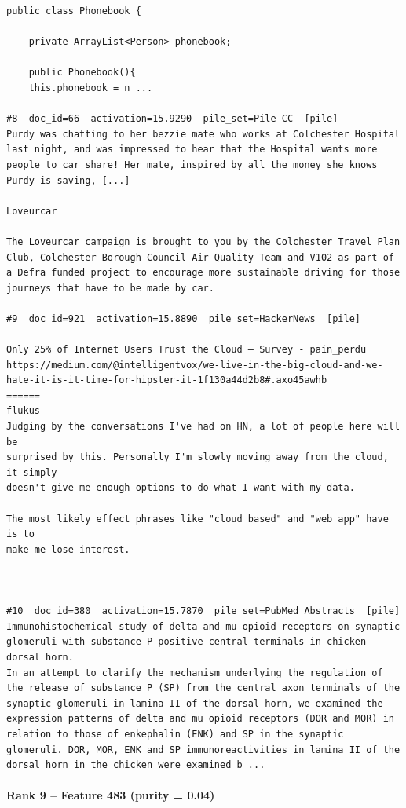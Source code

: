 \begin{verbatim}
public class Phonebook {

    private ArrayList<Person> phonebook;

    public Phonebook(){
    this.phonebook = n ...

#8  doc_id=66  activation=15.9290  pile_set=Pile-CC  [pile]
Purdy was chatting to her bezzie mate who works at Colchester Hospital last night, and was impressed to hear that the Hospital wants more people to car share! Her mate, inspired by all the money she knows Purdy is saving, [...]

Loveurcar

The Loveurcar campaign is brought to you by the Colchester Travel Plan Club, Colchester Borough Council Air Quality Team and V102 as part of a Defra funded project to encourage more sustainable driving for those journeys that have to be made by car.

#9  doc_id=921  activation=15.8890  pile_set=HackerNews  [pile]

Only 25% of Internet Users Trust the Cloud – Survey - pain_perdu
https://medium.com/@intelligentvox/we-live-in-the-big-cloud-and-we-hate-it-is-it-time-for-hipster-it-1f130a44d2b8#.axo45awhb
======
flukus
Judging by the conversations I've had on HN, a lot of people here will be
surprised by this. Personally I'm slowly moving away from the cloud, it simply
doesn't give me enough options to do what I want with my data.

The most likely effect phrases like "cloud based" and "web app" have is to
make me lose interest.



#10  doc_id=380  activation=15.7870  pile_set=PubMed Abstracts  [pile]
Immunohistochemical study of delta and mu opioid receptors on synaptic glomeruli with substance P-positive central terminals in chicken dorsal horn.
In an attempt to clarify the mechanism underlying the regulation of the release of substance P (SP) from the central axon terminals of the synaptic glomeruli in lamina II of the dorsal horn, we examined the expression patterns of delta and mu opioid receptors (DOR and MOR) in relation to those of enkephalin (ENK) and SP in the synaptic glomeruli. DOR, MOR, ENK and SP immunoreactivities in lamina II of the dorsal horn in the chicken were examined b ...

\end{verbatim}

\paragraph*{Rank 9 -- Feature 483 (purity = 0.04)}

